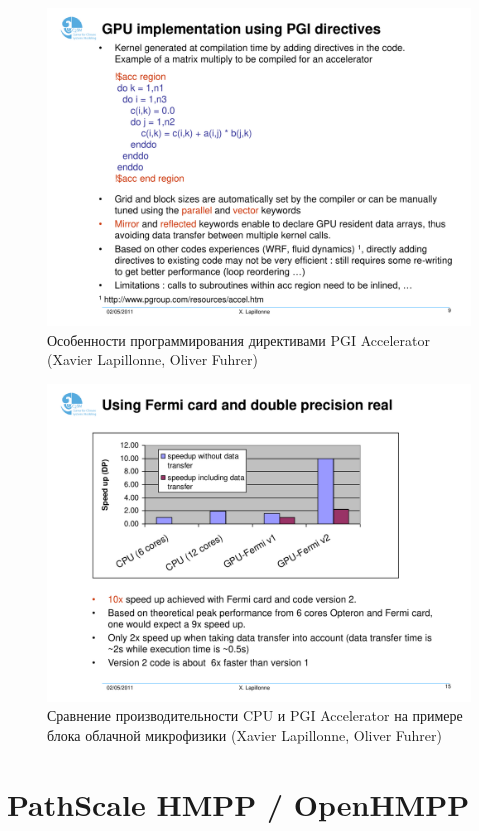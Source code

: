 \documentclass[a4,12pt]{report}
\begin{document}
\begin{figure}
\centering
\includegraphics[scale=0.4]{slides/06.pdf}
\caption{Особенности программирования директивами PGI Accelerator (Xavier Lapillonne, Oliver Fuhrer)}
\label{fig:06}
\end{figure}

\begin{figure}
\centering
\includegraphics[scale=0.4]{slides/07.pdf}
\caption{Сравнение производительности CPU и PGI Accelerator на примере блока облачной микрофизики (Xavier Lapillonne, Oliver Fuhrer)}
\label{fig:07}
\end{figure}

\section{PathScale HMPP / OpenHMPP}
\end{document}
